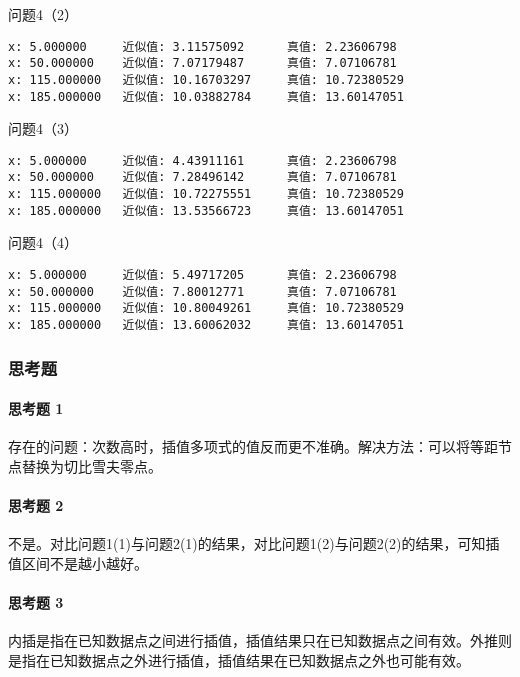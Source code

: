 \documentclass[a4paper,zihao=4,UTF8]{ctexart}
\begin{document}
问题4（2）

\begin{lstlisting}
x: 5.000000     近似值: 3.11575092      真值: 2.23606798
x: 50.000000    近似值: 7.07179487      真值: 7.07106781
x: 115.000000   近似值: 10.16703297     真值: 10.72380529
x: 185.000000   近似值: 10.03882784     真值: 13.60147051
\end{lstlisting}

问题4（3）

\begin{lstlisting}
x: 5.000000     近似值: 4.43911161      真值: 2.23606798
x: 50.000000    近似值: 7.28496142      真值: 7.07106781
x: 115.000000   近似值: 10.72275551     真值: 10.72380529
x: 185.000000   近似值: 13.53566723     真值: 13.60147051
\end{lstlisting}

问题4（4）

\begin{lstlisting}
x: 5.000000     近似值: 5.49717205      真值: 2.23606798
x: 50.000000    近似值: 7.80012771      真值: 7.07106781
x: 115.000000   近似值: 10.80049261     真值: 10.72380529
x: 185.000000   近似值: 13.60062032     真值: 13.60147051
\end{lstlisting}

\subsubsection*{思考题}

\paragraph*{思考题 1}

存在的问题：次数高时，插值多项式的值反而更不准确。解决方法：可以将等距节点替换为切比雪夫零点。 

\paragraph*{思考题 2}

不是。对比问题1(1)与问题2(1)的结果，对比问题1(2)与问题2(2)的结果，可知插值区间不是越小越好。

\paragraph*{思考题 3}

内插是指在已知数据点之间进行插值，插值结果只在已知数据点之间有效。外推则是指在已知数据点之外进行插值，插值结果在已知数据点之外也可能有效。
\end{document}
